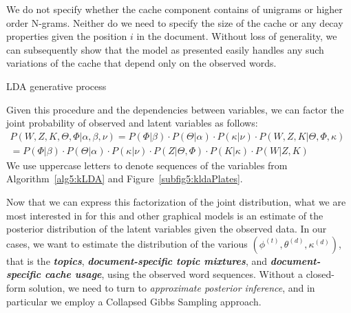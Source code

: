 We do not specify whether the cache component contains of unigrams or higher order N-grams.  Neither do we need to specify the size of the cache or any decay properties given the position $i$ in the document.  Without loss of generality, we can subsequently show that the model as presented easily handles any such variations of the cache that depend only on the observed words.


\begin{algorithm}[H]  
\caption{LDA generative process\label{alg5:LDA}}
\begin{algorithmic}[1]
\ENDFOR                                                

    \ENDFOR
\ENDFOR
\end{algorithmic}
\end{algorithm}


Given this procedure and the dependencies between variables, we can factor the joint probability of observed and latent variables as follows:
\begin{equation}
\begin{aligned}
P(W,Z,K,\Theta,\Phi|\alpha,\beta,\nu) = P(\Phi|\beta)\cdot  P(\Theta|\alpha)\cdot P(\kappa|\nu)\cdot P(W,Z,K|\Theta,\Phi,\kappa)& \label{eqn5:joint} \\
= P(\Phi|\beta)\cdot P(\Theta|\alpha) \cdot P(\kappa|\nu) \cdot P(Z|\Theta,\Phi) \cdot P(K|\kappa)\cdot P(W|Z,K)& 
\end{aligned}
\end{equation}
We use uppercase letters to denote sequences of the variables from  Algorithm~\ref{alg5:kLDA} and Figure~\ref{subfig5:kldaPlates}.  

Now that we can express this factorization of the joint distribution, what we are most interested in for this and other graphical models is an estimate of the posterior distribution of the latent variables given the observed data.  In our cases, we want to estimate the distribution of the various $(\phi^{(t)}, \theta^{(d)},\kappa^{(d)})$, that is the \textit{\textbf{topics}}, \textbf{\textit{document-specific topic mixtures}}, and \textbf{\textit{document-specific cache usage}}, using the observed word sequences.  Without a closed-form solution, we need to turn to \textit{approximate posterior inference}, and in particular we employ a Collapsed Gibbs Sampling approach.


